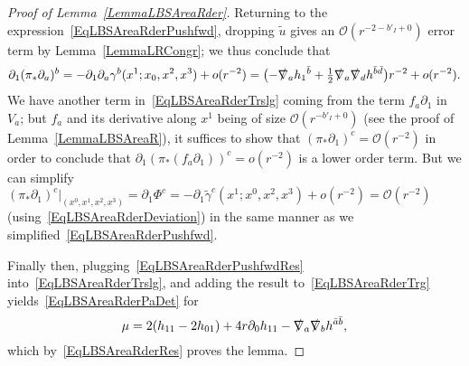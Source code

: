 \documentclass[reqno,11pt,letterpaper]{amsart}
\numberwithin{equation}{section}
\numberwithin{figure}{section}
\theoremstyle{definition}
\theoremstyle{remark}
\newcommand{\mc}{\mathcal}
\newcommand{\cO}{\mc O}
\newcommand{\slnabla}{\slashed{\nabla}{}}
\newcommand{\pa}{\partial}
\newcommand{\wt}{\widetilde}
\newcommand{\half}{\tfrac{1}{2}}
\newcommand{\usref}[1]{{\upshape\ref{#1}}}
\begin{document}
\begin{proof}[Proof of Lemma~\usref{LemmaLBSAreaRder}]
  Returning to the expression~\eqref{EqLBSAreaRderPushfwd}, dropping $\wt u$ gives an $\cO(r^{-2-b'_I+0})$ error term by Lemma~\ref{LemmaLRCongr}; we thus conclude that
  \begin{equation}
  \label{EqLBSAreaRderPushfwdRes}
    \pa_1(\pi_*\pa_a)^b = -\pa_1\pa_a\gamma^b(x^1;x_0,x^2,x^3) + o(r^{-2}) = \bigl(-\slnabla_a h_1{}^{\bar b}+\half\slnabla_a\slnabla_d h^{\bar b\bar d}\bigr)r^{-2} + o(r^{-2}).
  \end{equation}
  We have another term in~\eqref{EqLBSAreaRderTrslg} coming from the term $f_a\pa_1$ in $V_a$; but $f_a$ and its derivative along $x^1$ being of size $\cO(r^{-b'_I+0})$ (see the proof of Lemma~\ref{LemmaLBSAreaR}), it suffices to show that $(\pi_*\pa_1)^c=\cO(r^{-2})$ in order to conclude that $\pa_1(\pi_*(f_a\pa_1))^c=o(r^{-2})$ is a lower order term. But we can simplify $(\pi_*\pa_1)^c|_{(x^0,x^1,x^2,x^3)}=\pa_1\Phi^c=-\pa_1\wt\gamma^c(x^1;x^0,x^2,x^3)+o(r^{-2})=\cO(r^{-2})$ (using~\eqref{EqLBSAreaRderDeviation}) in the same manner as we simplified~\eqref{EqLBSAreaRderPushfwd}.
  
  Finally then, plugging~\eqref{EqLBSAreaRderPushfwdRes} into~\eqref{EqLBSAreaRderTrslg}, and adding the result to~\eqref{EqLBSAreaRderTrg} yields~\eqref{EqLBSAreaRderPaDet} for
  \[
    \mu = 2(h_{1 1}-2 h_{0 1}) + 4 r\pa_0 h_{1 1} - \slnabla_a\slnabla_b h^{\bar a\bar b},
  \]
  which by~\eqref{EqLBSAreaRderRes} proves the lemma.
\end{proof}
\end{document}
